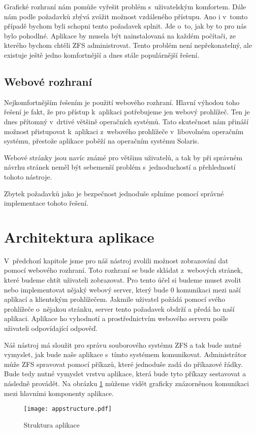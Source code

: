     Grafické rozhraní nám pomůže vyřešit problém s~uživatelským komfortem. Dále nám podle požadavků zbývá zvážit možnost vzdáleného přístupu. Ano i v~tomto případě bychom byli schopni tento požadavek splnit. Jde o~to, jak by to pro nás bylo pohodlné. Aplikace by musela být nainstalovaná na každém počítači, ze kterého bychom chtěli ZFS administrovat. Tento problém není nepřekonatelný, ale existuje ještě jedno komfortnější a dnes stále populárnější řešení.
    \subsection{Webové rozhraní}
    Nejkomfortnějším řešením je použití webového rozhraní. Hlavní výhodou toho řešení je fakt, že pro přístup k~aplikaci potřebujeme jen webový prohlížeč. Ten je dnes přítomný v~drtivé většině operačních systémů. Tato skutečnost nám přináší možnost přistupovat k~aplikaci z~webového prohlížeče v~libovolném operačním systému, přestože aplikace poběží na operačním systému Solaris.

    Webové stránky jsou navíc známé pro většinu uživatelů, a tak by při správném návrhu stránek neměl být sebemenší problém s~jednoduchostí a přehledností tohoto nástroje.

    Zbytek požadavků jako je bezpečnost jednoduše splníme pomocí správné implementace tohoto řešení.
\section{Architektura aplikace}
V~předchozí kapitole jsme pro náš nástroj zvolili možnost zobrazování dat pomocí webového rozhraní. Toto rozhraní se bude skládat z~webových stránek, které budeme chtít uživateli zobrazovat. Pro tento účel si budeme muset zvolit nebo implementovat nějaký webový server, který bude 0 komunikaci mezi naší aplikací a klientským prohlížečem. Jakmile uživatel požádá pomocí svého prohlížeče o~nějakou stránku, server tento požadavek obdrží a předá ho naší aplikaci. Aplikace ho vyhodnotí a prostřednictvím webového serveru pošle uživateli odpovídající odpověď.

Náš nástroj má sloužit pro správu souborového systému ZFS a tak bude nutné vymyslet, jak bude naše aplikace s~tímto systémem komunikovat. Administrátor může ZFS spravovat pomocí příkazů, které jednoduše zadá do příkazové řádky. Bude tedy nutné vymyslet vrstvu aplikace, která bude tyto příkazy sestavovat a následně provádět. Na obrázku \ref{architecture} můžeme vidět graficky znázorněnou komunikaci mezi hlavními komponenty aplikace.
\begin{figure}[h]
        \centering
        \texttt{[image: appstructure.pdf]}
        \caption{Struktura aplikace}
        \label{architecture}
\end{figure}
